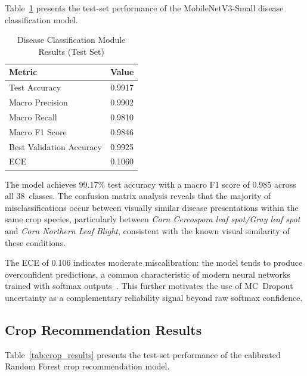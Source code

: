\documentclass[conference]{IEEEtran}
\begin{document}
Table~\ref{tab:disease_results} presents the test-set performance of the MobileNetV3-Small disease classification model.

\begin{table}[htbp]
  \centering
  \caption{Disease Classification Module Results (Test Set)}
  \label{tab:disease_results}
  \begin{tabular}{lc}
    \toprule
    \textbf{Metric} & \textbf{Value} \\
    \midrule
    Test Accuracy           & 0.9917 \\
    Macro Precision         & 0.9902 \\
    Macro Recall            & 0.9810 \\
    Macro F1 Score          & 0.9846 \\
    Best Validation Accuracy & 0.9925 \\
    ECE                     & 0.1060 \\
    \bottomrule
  \end{tabular}
\end{table}

The model achieves 99.17\% test accuracy with a macro F1 score of 0.985 across all 38~classes. The confusion matrix analysis reveals that the majority of misclassifications occur between visually similar disease presentations within the same crop species, particularly between \textit{Corn Cercospora leaf spot/Gray leaf spot} and \textit{Corn Northern Leaf Blight}, consistent with the known visual similarity of these conditions.

The ECE of 0.106 indicates moderate miscalibration: the model tends to produce overconfident predictions, a common characteristic of modern neural networks trained with softmax outputs~\cite{guo2017calibration}. This further motivates the use of MC~Dropout uncertainty as a complementary reliability signal beyond raw softmax confidence.

\subsection{Crop Recommendation Results}

Table~\ref{tab:crop_results} presents the test-set performance of the calibrated Random Forest crop recommendation model.
\end{document}
